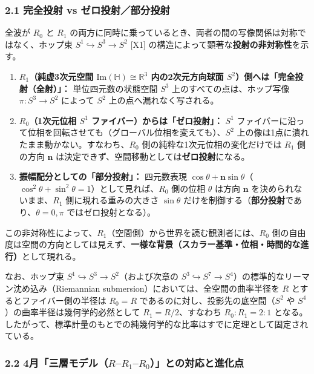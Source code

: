\documentclass[
  a4paper,
]{ltjsarticle}
\providecommand{\tightlist}{%
  \setlength{\itemsep}{0pt}\setlength{\parskip}{0pt}}
\begin{document}
\subsubsection{2.1 完全投射 vs
ゼロ投射／部分投射}\label{ux5b8cux5168ux6295ux5c04-vs-ux30bcux30edux6295ux5c04ux90e8ux5206ux6295ux5c04}

全波が \(R_0\) と \(R_1\)
の両方に同時に乗っているとき、両者の間の写像関係は対称ではなく、ホップ束
\(S^1 \hookrightarrow S^3 \to S^2\) {[}X1{]}
の構造によって顕著な\textbf{投射の非対称性}を示す。

\begin{enumerate}
\def\labelenumi{\arabic{enumi}.}
\tightlist
\item
  \textbf{\(R_1\)（純虚3次元空間
  \(\mathrm{Im}(\mathbb{H}) \cong \mathbb{R}^3\) 内の2次元方向球面
  \(S^2\)）側へは「完全投射（全射）」：} 単位四元数の状態空間 \(S^3\)
  上のすべての点は、ホップ写像 \(\pi : S^3 \to S^2\) によって \(S^2\)
  上の点へ漏れなく写される。
\item
  \textbf{\(R_0\)（1次元位相 \(S^1\) ファイバー）からは「ゼロ投射」：}
  \(S^1\)
  ファイバーに沿って位相を回転させても（グローバル位相を変えても）、\(S^2\)
  上の像は1点に潰れたまま動かない。すなわち、\(R_0\)
  側の純粋な1次元位相の変化だけでは \(R_1\) 側の方向 \(\mathbf{n}\)
  は決定できず、空間移動としては\textbf{ゼロ投射}になる。
\item
  \textbf{振幅配分としての「部分投射」：} 四元数表現
  \(\cos\theta + \mathbf{n}\sin\theta\)（\(\cos^2\theta + \sin^2\theta = 1\)）として見れば、\(R_0\)
  側の位相 \(\theta\) は方向 \(\mathbf{n}\) を決められないまま、\(R_1\)
  側に現れる重みの大きさ \(\sin\theta\)
  だけを制御する（\textbf{部分投射}であり、\(\theta = 0, \pi\)
  ではゼロ投射となる）。
\end{enumerate}

この非対称性によって、\(R_1\)（空間側）から世界を読む観測者には、\(R_0\)
側の自由度は空間の方向としては見えず、\textbf{一様な背景（スカラー基準・位相・時間的な進行）}として現れる。

なお、ホップ束 \(S^1 \hookrightarrow S^3 \to S^2\)（および次章の
\(S^3 \hookrightarrow S^7 \to S^4\)）の標準的なリーマン沈め込み（Riemannian
submersion）においては、全空間の曲率半径を \(R\)
とするとファイバー側の半径は \(R_0 = R\)
であるのに対し、投影先の底空間（\(S^2\) や
\(S^4\)）の曲率半径は幾何学的必然として \(R_1 = R/2\)、すなわち
\textbf{\(R_0 : R_1 = 2 : 1\)}
となる。したがって、標準計量のもとでの純幾何学的な比率はすでに定理として固定されている。

\subsubsection{\texorpdfstring{2.2
4月「三層モデル（\(R\)--\(R_1\)--\(R_0\)）」との対応と進化点}{2.2 4月「三層モデル（R--R\_1--R\_0）」との対応と進化点}}\label{ux6708ux4e09ux5c64ux30e2ux30c7ux30ebrr_1r_0ux3068ux306eux5bfeux5fdcux3068ux9032ux5316ux70b9}
\end{document}
